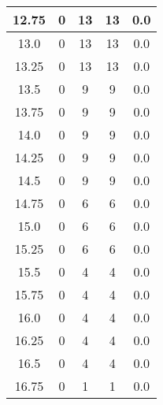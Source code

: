 \documentclass[letterpaper, 12pt]{article}
\begin{document}
\begin{longtable}{|c|c|c|c|c|}
\hline
12.75 & 0 & 13 & 13 & 0.0 \\
\hline
13.0 & 0 & 13 & 13 & 0.0 \\
\hline
13.25 & 0 & 13 & 13 & 0.0 \\
\hline
13.5 & 0 & 9 & 9 & 0.0 \\
\hline
13.75 & 0 & 9 & 9 & 0.0 \\
\hline
14.0 & 0 & 9 & 9 & 0.0 \\
\hline
14.25 & 0 & 9 & 9 & 0.0 \\
\hline
14.5 & 0 & 9 & 9 & 0.0 \\
\hline
14.75 & 0 & 6 & 6 & 0.0 \\
\hline
15.0 & 0 & 6 & 6 & 0.0 \\
\hline
15.25 & 0 & 6 & 6 & 0.0 \\
\hline
15.5 & 0 & 4 & 4 & 0.0 \\
\hline
15.75 & 0 & 4 & 4 & 0.0 \\
\hline
16.0 & 0 & 4 & 4 & 0.0 \\
\hline
16.25 & 0 & 4 & 4 & 0.0 \\
\hline
16.5 & 0 & 4 & 4 & 0.0 \\
\hline
16.75 & 0 & 1 & 1 & 0.0 \\
\hline
\end{longtable}
\end{document}
